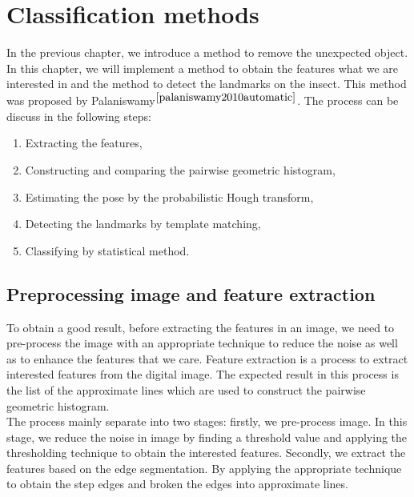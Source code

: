 \chapter{Classification methods }
In the previous chapter, we introduce a method to remove the unexpected object. In this chapter, we will implement a method to obtain the features what we are interested in and the method to detect the landmarks on the insect. This method was proposed by Palaniswamy$^{\cite{palaniswamy2010automatic}}$. The process can be discuss in the following steps:
\begin{enumerate}
\item Extracting the features,
\item Constructing and comparing the pairwise geometric histogram,
\item Estimating the pose by the probabilistic Hough transform,
\item Detecting the landmarks by template matching,
\item Classifying by statistical method.
\end{enumerate}
\section{Preprocessing image and feature extraction}
To obtain a good result, before extracting the features in an image, we need to pre-process the image with an appropriate technique to reduce the noise as well as to enhance the features that we care. 
Feature extraction is a process to extract interested features from the digital image. The expected result in this process is the list of the approximate lines which are used to construct the pairwise geometric histogram. \\[0.2cm]
The process mainly separate into two stages: firstly, we pre-process image. In this stage, we reduce the noise in image by finding a threshold value and applying the thresholding technique to obtain the interested features. Secondly, we extract the features based on the edge segmentation. By applying the appropriate technique to obtain the step edges and broken the edges into approximate lines.
